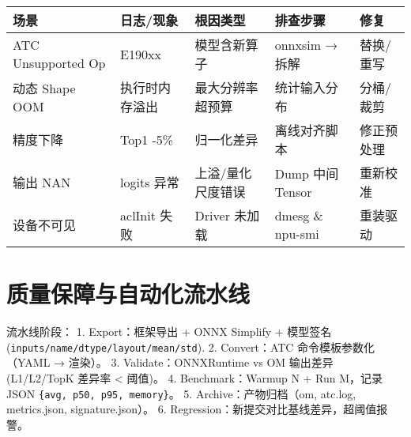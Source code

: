 \begin{longtable}[]{@{}
  >{\raggedright\arraybackslash}p{}
  >{\raggedright\arraybackslash}p{}
  >{\raggedright\arraybackslash}p{}
  >{\raggedright\arraybackslash}p{}
  >{\raggedright\arraybackslash}p{}@{}}
\toprule\noalign{}
\begin{minipage}[b]{\linewidth}\raggedright
场景
\end{minipage} & \begin{minipage}[b]{\linewidth}\raggedright
日志/现象
\end{minipage} & \begin{minipage}[b]{\linewidth}\raggedright
根因类型
\end{minipage} & \begin{minipage}[b]{\linewidth}\raggedright
排查步骤
\end{minipage} & \begin{minipage}[b]{\linewidth}\raggedright
修复
\end{minipage} \\
\midrule\noalign{}
\endhead
\bottomrule\noalign{}
\endlastfoot
ATC Unsupported Op & E190xx & 模型含新算子 & onnxsim → 拆解 &
替换/重写 \\
动态 Shape OOM & 执行时内存溢出 & 最大分辨率超预算 & 统计输入分布 &
分桶/裁剪 \\
精度下降 & Top1 -5\% & 归一化差异 & 离线对齐脚本 & 修正预处理 \\
输出 NAN & logits 异常 & 上溢/量化尺度错误 & Dump 中间 Tensor &
重新校准 \\
设备不可见 & aclInit 失败 & Driver 未加载 & dmesg \& npu-smi &
重装驱动 \\
\end{longtable}

\section{质量保障与自动化流水线}\label{ux8d28ux91cfux4fddux969cux4e0eux81eaux52a8ux5316ux6d41ux6c34ux7ebf}

流水线阶段： 1. Export：框架导出 + ONNX Simplify +
模型签名(\passthrough{\lstinline!inputs/name/dtype/layout/mean/std!}).
2. Convert：ATC 命令模板参数化（YAML → 渲染）。 3. Validate：ONNXRuntime
vs OM 输出差异 (L1/L2/TopK 差异率 \textless{} 阈值)。 4.
Benchmark：Warmup N + Run M，记录 JSON
\passthrough{\lstinline!\{avg, p50, p95, memory\}!}。 5.
Archive：产物归档（om, atc.log, metrics.json, signature.json）。 6.
Regression：新提交对比基线差异，超阈值报警。

